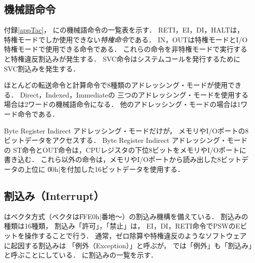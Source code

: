 \subsection{機械語命令}
付録\ref{appTac}，
に{\tac}の機械語命令の一覧表を示す．
RETI，EI，DI，HALTは，
特権モードでしか使用できない\emph{特権命令}である．
IN，OUTは特権モードとI/O特権モードで使用できる命令である．
これらの命令を非特権モードで実行すると特権違反割込みが発生する．
SVC命令はシステムコールを発行するためにSVC割込みを発生する．

ほとんどの転送命令と計算命令で8種類のアドレッシング・モードが使用できる．
Direct，Indexed，Immediateの
三つのアドレッシング・モードを使用する場合は2ワードの機械語命令になる．
他のアドレッシング・モードの場合は1ワード命令である．

Byte Register Indirect アドレッシング・モードだけが，
メモリやI/Oポートの8ビットデータをアクセスする．
Byte Register Indirect アドレッシング・モードの
ST命令とOUT命令は，CPUレジスタの下位8ビットをメモリやI/Oポートに書き込む．
これら以外の命令は，メモリやI/Oポートから読み出した8ビットデータの上位に
\|00h|を付加した16ビットデータを使用する．

\subsection{割込み（Interrupt）}
{\tac}はベクタ方式（ベクタは\|FFE0h|番地〜）の割込み機構を備えている．
割込みの種類は16種類，
割込み「許可」，「禁止」は，
EI，DI，RETI命令でPSWのEビットを操作することで行う．
通常，ゼロ除算や特権違反のようなソフトウェアに起因する割込みは
「例外（Exception）」と呼ぶが，
{\tac}では「例外」も「割込み」と呼ぶことにしている．
に割込みの一覧を示す．

